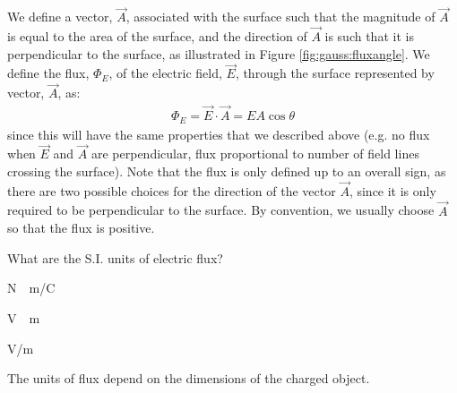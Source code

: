 We define a vector, $\vec A$, associated with the surface such that the magnitude of $\vec A$ is equal to the area of the surface, and the direction of $\vec A$ is such that it is perpendicular to the surface, as illustrated in Figure \ref{fig:gauss:fluxangle}. We define the flux, $\Phi_E$, of the electric field, $\vec E$, through the surface represented by vector, $\vec A$, as:
\begin{align*}
\Phi_E=\vec E\cdot \vec A=EA\cos\theta
\end{align*}
since this will have the same properties that we described above (e.g. no flux when $\vec E$ and $\vec A$ are perpendicular, flux proportional to number of field lines crossing the surface). Note that the flux is only defined up to an overall sign, as there are two possible choices for the direction of the vector $\vec A$, since it is only required to be perpendicular to the surface. By convention, we usually choose $\vec A$ so that the flux is positive.
\begin{checkpoint}\label{cp:gauss:unitsofflux}

	\begin{MCquestion}{What are the S.I. units of electric flux?}
		\item \si{N\cdot m/C}
		\item \si{V\cdot m} \correct
		\item \si{V/m}
		\item The units of flux depend on the dimensions of the charged object.
	\end{MCquestion}
\end{checkpoint}
\vspace{-0.25cm}
